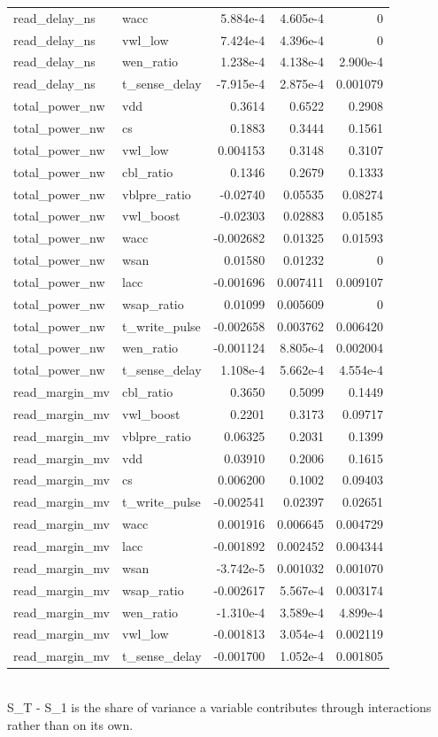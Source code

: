 \begin{table}[!t]
\begin{tabular}{llrrr}
read\_delay\_ns & wacc & 5.884e-4 & 4.605e-4 & 0 \\
read\_delay\_ns & vwl\_low & 7.424e-4 & 4.396e-4 & 0 \\
read\_delay\_ns & wen\_ratio & 1.238e-4 & 4.138e-4 & 2.900e-4 \\
read\_delay\_ns & t\_sense\_delay & -7.915e-4 & 2.875e-4 & 0.001079 \\
total\_power\_nw & vdd & 0.3614 & 0.6522 & 0.2908 \\
total\_power\_nw & cs & 0.1883 & 0.3444 & 0.1561 \\
total\_power\_nw & vwl\_low & 0.004153 & 0.3148 & 0.3107 \\
total\_power\_nw & cbl\_ratio & 0.1346 & 0.2679 & 0.1333 \\
total\_power\_nw & vblpre\_ratio & -0.02740 & 0.05535 & 0.08274 \\
total\_power\_nw & vwl\_boost & -0.02303 & 0.02883 & 0.05185 \\
total\_power\_nw & wacc & -0.002682 & 0.01325 & 0.01593 \\
total\_power\_nw & wsan & 0.01580 & 0.01232 & 0 \\
total\_power\_nw & lacc & -0.001696 & 0.007411 & 0.009107 \\
total\_power\_nw & wsap\_ratio & 0.01099 & 0.005609 & 0 \\
total\_power\_nw & t\_write\_pulse & -0.002658 & 0.003762 & 0.006420 \\
total\_power\_nw & wen\_ratio & -0.001124 & 8.805e-4 & 0.002004 \\
total\_power\_nw & t\_sense\_delay & 1.108e-4 & 5.662e-4 & 4.554e-4 \\
read\_margin\_mv & cbl\_ratio & 0.3650 & 0.5099 & 0.1449 \\
read\_margin\_mv & vwl\_boost & 0.2201 & 0.3173 & 0.09717 \\
read\_margin\_mv & vblpre\_ratio & 0.06325 & 0.2031 & 0.1399 \\
read\_margin\_mv & vdd & 0.03910 & 0.2006 & 0.1615 \\
read\_margin\_mv & cs & 0.006200 & 0.1002 & 0.09403 \\
read\_margin\_mv & t\_write\_pulse & -0.002541 & 0.02397 & 0.02651 \\
read\_margin\_mv & wacc & 0.001916 & 0.006645 & 0.004729 \\
read\_margin\_mv & lacc & -0.001892 & 0.002452 & 0.004344 \\
read\_margin\_mv & wsan & -3.742e-5 & 0.001032 & 0.001070 \\
read\_margin\_mv & wsap\_ratio & -0.002617 & 5.567e-4 & 0.003174 \\
read\_margin\_mv & wen\_ratio & -1.310e-4 & 3.589e-4 & 4.899e-4 \\
read\_margin\_mv & vwl\_low & -0.001813 & 3.054e-4 & 0.002119 \\
read\_margin\_mv & t\_sense\_delay & -0.001700 & 1.052e-4 & 0.001805 \\
\bottomrule
\end{tabular}
\\[2pt] \footnotesize S\_T - S\_1 is the share of variance a variable contributes through interactions rather than on its own.
\end{table}
